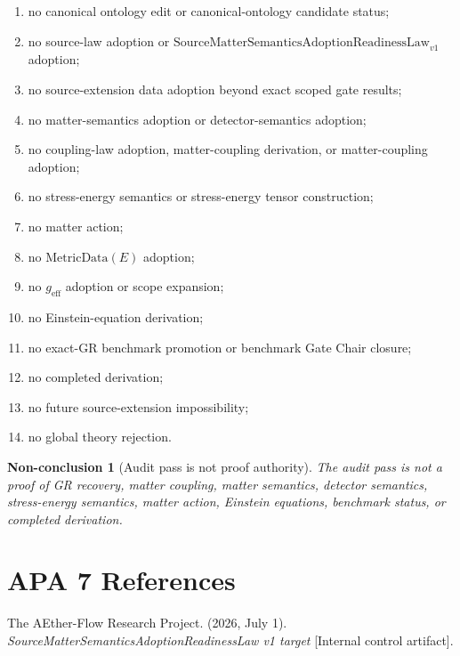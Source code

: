 \documentclass[11pt]{article}
\newcommand{\SMSAR}{\mathrm{SourceMatterSemanticsAdoptionReadinessLaw}_{v1}}
\newcommand{\MetricData}{\mathrm{MetricData}}
\newcommand{\geff}{g_{\mathrm{eff}}}
\newtheorem{nonconclusion}{Non-conclusion}
\begin{document}
\begin{enumerate}[leftmargin=*]
  \item no canonical ontology edit or canonical-ontology candidate status;
  \item no source-law adoption or \(\SMSAR\) adoption;
  \item no source-extension data adoption beyond exact scoped gate results;
  \item no matter-semantics adoption or detector-semantics adoption;
  \item no coupling-law adoption, matter-coupling derivation, or matter-coupling adoption;
  \item no stress-energy semantics or stress-energy tensor construction;
  \item no matter action;
  \item no \(\MetricData(E)\) adoption;
  \item no \(\geff\) adoption or scope expansion;
  \item no Einstein-equation derivation;
  \item no exact-GR benchmark promotion or benchmark Gate Chair closure;
  \item no completed derivation;
  \item no future source-extension impossibility;
  \item no global theory rejection.
\end{enumerate}

\begin{nonconclusion}[Audit pass is not proof authority]
The audit pass is not a proof of GR recovery, matter coupling, matter
semantics, detector semantics, stress-energy semantics, matter action,
Einstein equations, benchmark status, or completed derivation.
\end{nonconclusion}

\section{APA 7 References}

The AEther-Flow Research Project. (2026, July 1).
\emph{SourceMatterSemanticsAdoptionReadinessLaw v1 target}
[Internal control artifact].
\end{document}

